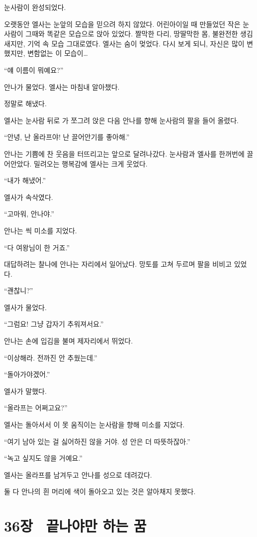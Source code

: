 눈사람이 완성되었다.

오랫동안 엘사는 눈앞의 모습을 믿으려 하지 않았다. 어린아이일 때 만들었던 작은 눈사람이 그때와 똑같은 모습으로 앉아 있었다. 짤막한 다리, 땅딸막한 몸, 불완전한 생김새지만, 기억 속 모습 그대로였다. 엘사는 숨이 멎었다. 다시 보게 되니, 자신은 많이 변했지만, 변함없는 이 모습이\ldots

``얘 이름이 뭐예요?''

안나가 물었다. 엘사는 마침내 알아챘다.

정말로 해냈다.

엘사는 눈사람 뒤로 가 쪼그려 앉은 다음 안나를 향해 눈사람의 팔을 들어 올렸다.

``안녕, 난 올라프야! 난 끌어안기를 좋아해.''

안나는 기쁨에 찬 웃음을 터뜨리고는 앞으로 달려나갔다. 눈사람과 엘사를 한꺼번에 끌어안았다. 밀려오는 행복감에 엘사는 크게 웃었다.

``내가 해냈어.''

엘사가 속삭였다.

``고마워, 안나야.''

안나는 씩 미소를 지었다.

``다 여왕님이 한 거죠.''

대답하려는 찰나에 안나는 자리에서 일어났다. 망토를 고쳐 두르며 팔을 비비고 있었다.

``괜찮니?''

엘사가 물었다.

``그럼요! 그냥 갑자기 추워져서요.''

안나는 손에 입김을 불며 제자리에서 뛰었다.

``이상해라. 전까진 안 추웠는데.''

``돌아가야겠어.''

엘사가 말했다.

``올라프는 어쩌고요?''

엘사는 돌아서서 이 못 움직이는 눈사람을 향해 미소를 지었다.

``여기 남아 있는 걸 싫어하진 않을 거야. 성 안은 더 따뜻하잖아.''

``녹고 싶지도 않을 거예요.''

엘사는 올라프를 남겨두고 안나를 성으로 데려갔다.

둘 다 안나의 흰 머리에 색이 돌아오고 있는 것은 알아채지 못했다.



\chapter[36장  끝나야만 하는 꿈][36장\hspace*{.5em}끝나야만 하는 꿈]{36장 \ 끝나야만 하는 꿈}



